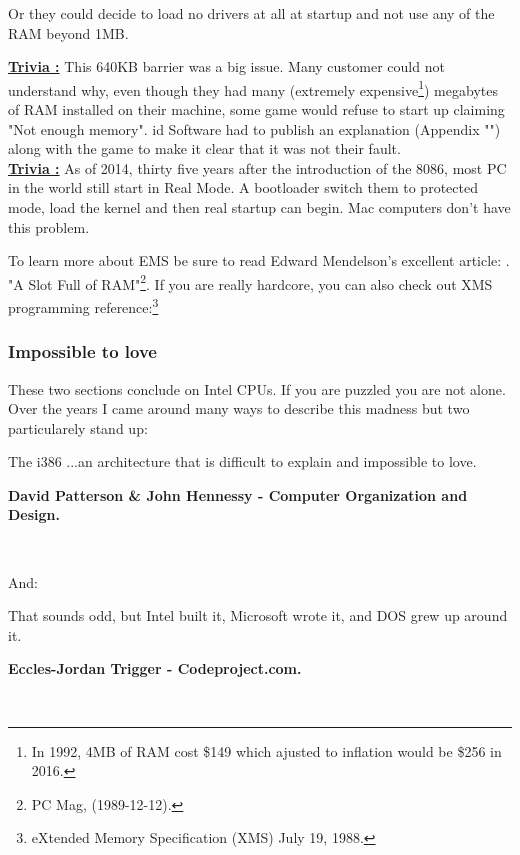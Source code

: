 \documentclass[book.tex]{subfiles}
\begin{document}
Or they could decide to load no drivers at all at startup and not use any of the RAM beyond 1MB.\\
\par
\textbf{\underline{Trivia :}}  This 640KB barrier was a big issue. Many customer could not understand why, even though they had many (extremely expensive\footnote{In 1992, 4MB of RAM cost \$149 which ajusted to inflation would be \$256 in 2016.}) megabytes of RAM installed on their machine, some game would refuse to start up claiming "Not enough memory". id Software had to publish an explanation (Appendix "") along with the game to make it clear that it was not their fault.\\

\textbf{\underline{Trivia :}}  As of 2014, thirty five years after the introduction of the 8086, most PC in the world still start in Real Mode. A bootloader switch them to protected mode, load the kernel and then real startup can begin. Mac computers don't have this problem.

\bigskip
To learn more about EMS be sure to read Edward Mendelson's excellent article: . "A Slot Full of RAM"\footnote{PC Mag, (1989-12-12).}. If you are really hardcore, you can also check out XMS programming reference:\footnote{eXtended Memory Specification (XMS) July 19, 1988.}\\
\par

\subsubsection{Impossible to love}
These two sections conclude on Intel CPUs. If you are puzzled you are not alone. Over the years I came around many ways to describe this madness but two particularely stand up:\\
\par
 \begin{fancyquotes}
   The i386 \lbrack...\rbrack an architecture that is difficult to explain and impossible to love.\\
   \par
\textbf{David Patterson \& John Hennessy - Computer Organization and Design.}
 \end{fancyquotes}\\
\par
And:
\par
 \begin{fancyquotes}
    That sounds odd, but Intel built it, Microsoft wrote it, and DOS grew up around it.\\
   \par
\textbf{Eccles-Jordan Trigger - Codeproject.com.}
 \end{fancyquotes}\\
\end{document}
